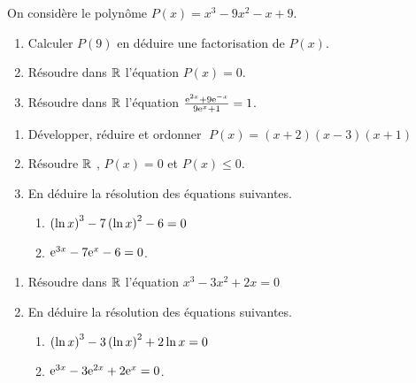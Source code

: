   \begin{exercice}
  On considère le polynôme $ P(x)=x^{3}-9x^{2}-x+9$.
\begin{enumerate}
\item Calculer  $ P(9) $  en déduire une factorisation de  $ P(x)$.
\item Résoudre dans $ \mathbb{R} $  l'équation $ P(x)=0 $.
\item Résoudre dans $ \mathbb{R} $  l'équation $ \frac{\mathrm{e}^{2x}+9\mathrm{e}^{-x}}{9\mathrm{e}^{x}+1}=1$.
\end{enumerate}
 \end{exercice}
  
 \begin{exercice}

\begin{enumerate} 
\item Développer, réduire et ordonner  $\; P(x)=(x+2)(x-3)(x+1) $ 
\item Résoudre $ \mathbb{R} $  , $ P(x)=0 $  et  $ P(x)\leq0 $.
\item En déduire  la résolution des équations suivantes.
\begin{enumerate} 
\item $\left(\ln x\right)^{3}-7\left(\ln x\right)^{2}-6=0  $                                                   
 \item $ \mathrm{e}^{3x}-7\mathrm{e}^{x}-6=0 $.

\end{enumerate}
\end{enumerate}

  \end{exercice}
  \begin{exercice}

\begin{enumerate}
\item Résoudre dans $ \mathbb{R} $   l'équation $x^{3}-3x^{2}+2x=0  $ 
\item En déduire  la résolution des équations suivantes.
\begin{enumerate} 
\item $\left(\ln x\right)^{3}-3\left(\ln x\right)^{2}+2\ln x=0  $                                                   
\item $ \mathrm{e}^{3x}-3\mathrm{e}^{2x}+2\mathrm{e}^{x}=0 $.

\end{enumerate}
\end{enumerate}

  \end{exercice}
  

